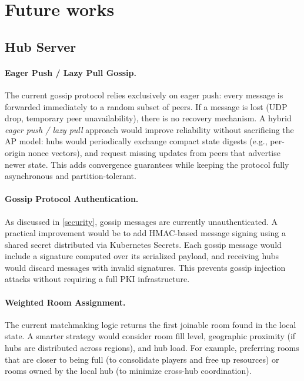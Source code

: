 \section{Future works}\label{future-works}

\subsection{Hub Server}

\paragraph{Eager Push / Lazy Pull Gossip.}
The current gossip protocol relies exclusively on eager push: every message is forwarded immediately to a random subset of peers.
If a message is lost (UDP drop, temporary peer unavailability), there is no recovery mechanism.
A hybrid \textit{eager push / lazy pull} approach would improve reliability without sacrificing the AP model: hubs would periodically exchange compact state digests (e.g., per-origin nonce vectors), and request missing updates from peers that advertise newer state.
This adds convergence guarantees while keeping the protocol fully asynchronous and partition-tolerant.

\paragraph{Gossip Protocol Authentication.}
As discussed in \cref{security}, gossip messages are currently unauthenticated.
A practical improvement would be to add HMAC-based message signing using a shared secret distributed via Kubernetes Secrets.
Each gossip message would include a signature computed over its serialized payload, and receiving hubs would discard messages with invalid signatures.
This prevents gossip injection attacks without requiring a full PKI infrastructure.

\paragraph{Weighted Room Assignment.}
The current matchmaking logic returns the first joinable room found in the local state.
A smarter strategy would consider room fill level, geographic proximity (if hubs are distributed across regions), and hub load.
For example, preferring rooms that are closer to being full (to consolidate players and free up resources) or rooms owned by the local hub (to minimize cross-hub coordination).

